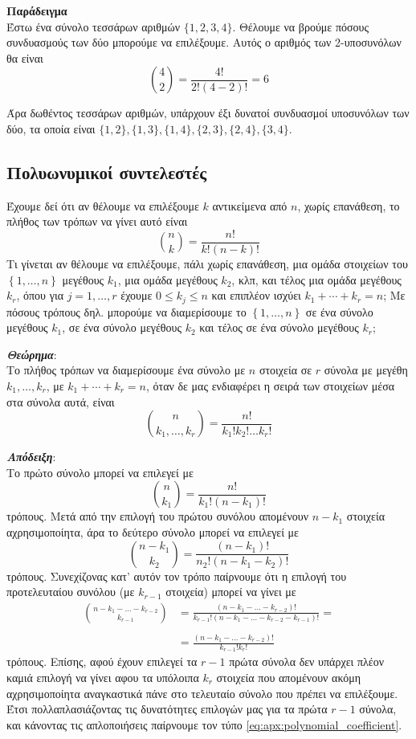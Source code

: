 \textbf{Παράδειγμα}\\

Έστω ένα σύνολο τεσσάρων αριθμών $\{1,2,3,4\}$. Θέλουμε να βρούμε πόσους συνδυασμούς των δύο μπορούμε να επιλέξουμε. Αυτός ο αριθμός των 2-υποσυνόλων θα είναι
\begin{equation}
    {4 \choose 2} = \frac{4!}{2! (4-2)!} = 6
\end{equation}

Άρα δωθέντος τεσσάρων αριθμών, υπάρχουν έξι δυνατοί συνδυασμοί υποσυνόλων των δύο, τα οποία είναι
$\{1,2\}, \{1,3\}, \{1,4\}, \{2,3\}, \{2,4\}, \{3,4\}$.


\subsection{Πολυωνυμικοί συντελεστές}
Έχουμε δεί ότι αν θέλουμε να επιλέξουμε $k$ αντικείμενα από $n$, χωρίς επανάθεση, το πλήθος των τρόπων να γίνει αυτό είναι
$${n \choose k} = \frac{n!}{k!(n-k)!}$$
Τι γίνεται αν θέλουμε να επιλέξουμε, πάλι χωρίς επανάθεση, μια ομάδα στοιχείων του $ {\left\{{1,\ldots,n}\right\}}$ μεγέθους $ k_1$, μια ομάδα μεγέθους $ k_2$, κλπ, και τέλος μια ομάδα μεγέθους $ k_r$, όπου για $ j=1,\ldots,r$ έχουμε $ 0 \le k_j \le n$ και επιπλέον ισχύει $ k_1+\cdots +k_r = n$; Με πόσους τρόπους δηλ. μπορούμε να διαμερίσουμε το $ {\left\{{1,\ldots,n}\right\}}$ σε ένα σύνολο μεγέθους $ k_1$, σε ένα σύνολο μεγέθους $ k_2$ και τέλος σε ένα σύνολο μεγέθους $ k_r$;

\textit{\textbf{Θεώρημα}}:\\
Το πλήθος τρόπων να διαμερίσουμε ένα σύνολο με $ n$ στοιχεία σε $ r$ σύνολα με μεγέθη $ k_1,\ldots,k_r$, με $ k_1+\cdots +k_r = n$, όταν δε μας ενδιαφέρει η σειρά των στοιχείων μέσα στα σύνολα αυτά, είναι
\begin{equation}
    \label{eq:apx:polynomial_coefficient}
    {n \choose k_1, \dots, k_r} = \frac{n!}{k_1! k_2! \dots k_r!}
\end{equation}

\textit{\textbf{Απόδειξη}}:\\
Το πρώτο σύνολο μπορεί να επιλεγεί με
$${n \choose k_1} = \frac{n!}{k_1! (n-k_1)!}$$
τρόπους. Μετά από την επιλογή του πρώτου συνόλου απομένουν $ n-k_1$ στοιχεία αχρησιμοποίητα, άρα το δεύτερο σύνολο μπορεί να επιλεγεί με
$${n-k_1 \choose k_2} = \frac{(n-k_1)!}{n_2! (n-k_1-k_2)!}$$
τρόπους. Συνεχίζονας κατ' αυτόν τον τρόπο παίρνουμε ότι η επιλογή του προτελευταίου συνόλου (με $ k_{r-1}$ στοιχεία) μπορεί να γίνει με
\begin{align*}
    {n - k_1 - \dots - k_{r-2} \choose k_{r-1}} &= \frac{(n - k_1 - \dots - k_{r-2})!}{k_{r-1}! (n - k_1 - \dots - k_{r-2} - k_{r-1})!} = \\\\
    &= \frac{(n - k_1 - \dots - k_{r-2})!}{k_{r-1}! k_r!}
\end{align*}
τρόπους. Επίσης, αφού έχουν επιλεγεί τα $ r-1$ πρώτα σύνολα δεν υπάρχει πλέον καμιά επιλογή να γίνει αφου τα υπόλοιπα $ k_r$ στοιχεία που απομένουν ακόμη αχρησιμοποίητα αναγκαστικά πάνε στο τελευταίο σύνολο που πρέπει να επιλέξουμε.
Έτσι πολλαπλασιάζοντας τις δυνατότητες επιλογών μας για τα πρώτα $ r-1$ σύνολα, και κάνοντας τις απλοποιήσεις παίρνουμε τον τύπο \eqref{eq:apx:polynomial_coefficient}.

